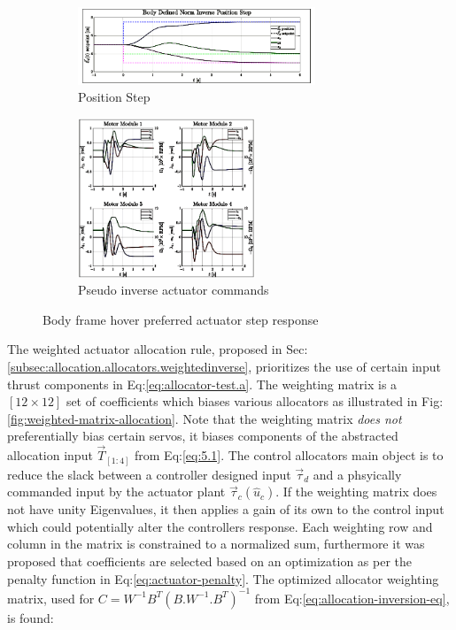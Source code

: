 \begin{figure}[htbp]
\ContinuedFloat
\begin{subfigure}{\textwidth}
\vspace{-3pt}
\centering
\includegraphics[width=0.78\textwidth]{graphs/body_norm_position}
\vspace{-4pt}
\caption{Position Step}
\label{fig:body_norm_position}
\end{subfigure}
\vspace{-8pt}
\begin{subfigure}{\textwidth}
\centering
\includegraphics[width=0.58\textwidth]{graphs/body_norm_input}
\vspace{-4pt}
\caption{Pseudo inverse actuator commands}
\label{fig:body_norm_input}
\end{subfigure}
\caption{Body frame hover preferred actuator step response}
\label{fig:body-norm-step}
\vspace{-10pt}
\end{figure}
\par
The weighted actuator allocation rule, proposed in Sec:\ref{subsec:allocation.allocators.weightedinverse}, prioritizes the use of certain input thrust components in Eq:\ref{eq:allocator-test.a}. The weighting matrix is a $[12\times 12]$ set of coefficients which biases various allocators as illustrated in Fig:\ref{fig:weighted-matrix-allocation}. Note that the weighting matrix \emph{does not} preferentially bias certain servos, it biases components of the abstracted allocation input $\vec{T}_{[1:4]}$ from Eq:\ref{eq:5.1}. The control allocators main object is to reduce the slack between a controller designed input $\vec{\tau}_d$ and a phsyically commanded input by the actuator plant $\vec{\tau}_c(\hat{u}_c)$. If the weighting matrix does not have unity Eigenvalues, it then applies a gain of its own to the control input which could potentially alter the controllers response. Each weighting row and column in the matrix is constrained to a normalized sum, furthermore it was proposed that coefficients are selected based on an optimization as per the penalty function in Eq:\ref{eq:actuator-penalty}. The optimized allocator weighting matrix, used for $C=W^{-1}B^T(B.W^{-1}.B^T)^{-1}$ from Eq:\ref{eq:allocation-inversion-eq}, is found:
